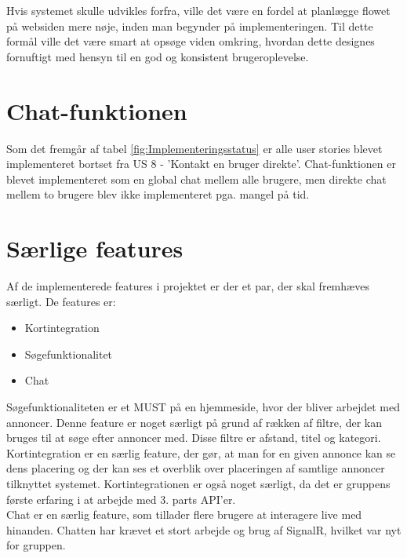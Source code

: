 \noindent Hvis systemet skulle udvikles forfra, ville det være en fordel at planlægge flowet på websiden mere nøje, inden man begynder på implementeringen. Til dette formål ville det være smart at opsøge viden omkring, hvordan dette designes fornuftigt med hensyn til en god og konsistent brugeroplevelse.

\section{Chat-funktionen}
Som det fremgår af tabel \ref{fig:Implementeringsstatus} er alle user stories blevet implementeret bortset fra US 8 - 'Kontakt en bruger direkte'. Chat-funktionen er blevet implementeret som en global chat mellem alle brugere, men direkte chat mellem to brugere blev ikke implementeret pga. mangel på tid.

	
\section{Særlige features}
Af de implementerede features i projektet er der et par, der skal fremhæves særligt.
De features er:
\begin{itemize}[noitemsep]
	\item Kortintegration
	\item Søgefunktionalitet 
	\item Chat
\end{itemize}

\noindent Søgefunktionaliteten er et MUST på en hjemmeside, hvor der bliver arbejdet med annoncer. Denne feature er noget særligt på grund af rækken af filtre, der kan bruges til at søge efter annoncer med. Disse filtre er afstand, titel og kategori. \\

\noindent Kortintegration er en særlig feature, der gør, at man for en given annonce kan se dens placering og der kan ses et overblik over  placeringen af samtlige annoncer tilknyttet systemet. Kortintegrationen er også noget særligt, da det er gruppens første erfaring i at arbejde med 3. parts API'er. \\

Chat er en særlig feature, som tillader flere brugere at interagere live med hinanden. Chatten har krævet et stort arbejde og brug af SignalR, hvilket var nyt for gruppen.




 